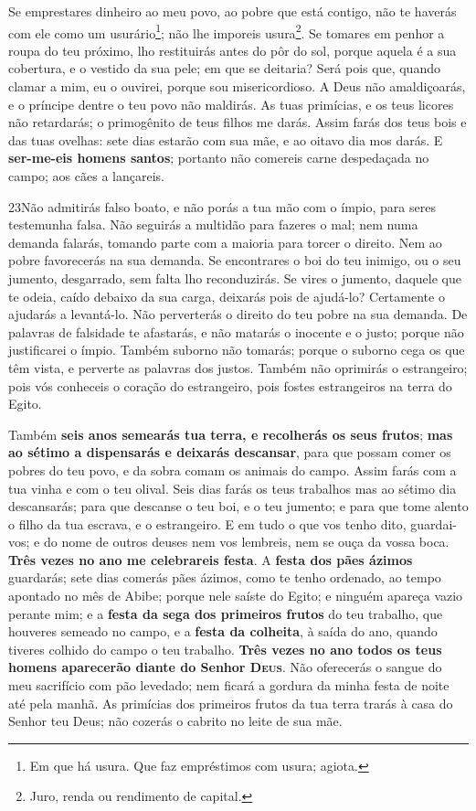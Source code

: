 Se emprestares dinheiro ao meu povo, ao pobre que está contigo,
não te haverás com ele como um usurário\footnote{Em que há usura.
Que faz empréstimos com usura; agiota.}; não lhe imporeis
usura\footnote{Juro, renda ou rendimento de capital.}. Se
tomares em penhor a roupa do teu próximo, lho restituirás antes do
pôr do sol, porque aquela é a sua cobertura, e o vestido da
sua pele; em que se deitaria? Será pois que, quando clamar a mim, eu
o ouvirei, porque sou misericordioso. A Deus não
amaldiçoarás, e o príncipe dentre o teu povo não maldirás. As
tuas primícias, e os teus licores não retardarás; o primogênito de
teus filhos me darás. Assim farás dos teus bois e das tuas
ovelhas: sete dias estarão com sua mãe, e ao oitavo dia mos darás.
E \textbf{ser-me-eis homens santos}; portanto não comereis
carne despedaçada no campo; aos cães a lançareis.

\medskip

\lettrine{23} Não admitirás falso boato, e não porás a tua mão
com o ímpio, para seres testemunha falsa. Não seguirás a
multidão para fazeres o mal; nem numa demanda falarás, tomando parte
com a maioria para torcer o direito. Nem ao pobre favorecerás na
sua demanda. Se encontrares o boi do teu inimigo, ou o seu
jumento, desgarrado, sem falta lho reconduzirás. Se vires o
jumento, daquele que te odeia, caído debaixo da sua carga, deixarás
pois de ajudá-lo? Certamente o ajudarás a levantá-lo. Não
perverterás o direito do teu pobre na sua demanda. De palavras
de falsidade te afastarás, e não matarás o inocente e o justo;
porque não justificarei o ímpio. Também suborno não tomarás;
porque o suborno cega os que têm vista, e perverte as palavras dos
justos. Também não oprimirás o estrangeiro; pois vós conheceis o
coração do estrangeiro, pois fostes estrangeiros na terra do Egito.

Também \textbf{seis anos semearás tua terra, e recolherás os seus
frutos}; \textbf{mas ao sétimo a dispensarás e deixarás
descansar}, para que possam comer os pobres do teu povo, e da sobra
comam os animais do campo. Assim farás com a tua vinha e com o teu
olival. Seis dias farás os teus trabalhos mas ao sétimo dia
descansarás; para que descanse o teu boi, e o teu jumento; e para
que tome alento o filho da tua escrava, e o estrangeiro. E em
tudo o que vos tenho dito, guardai-vos; e do nome de outros deuses
nem vos lembreis, nem se ouça da vossa boca. \textbf{Três
vezes no ano me celebrareis festa}. A \textbf{festa dos pães
ázimos} guardarás; sete dias comerás pães ázimos, como te tenho
ordenado, ao tempo apontado no mês de Abibe; porque nele saíste do
Egito; e ninguém apareça vazio perante mim; e a \textbf{festa
da sega dos primeiros frutos} do teu trabalho, que houveres semeado
no campo, e a \textbf{festa da colheita}, à saída do ano, quando
tiveres colhido do campo o teu trabalho. \textbf{Três vezes
no ano todos os teus homens aparecerão diante do Senhor
\textsc{Deus}}. Não oferecerás o sangue do meu sacrifício com
pão levedado; nem ficará a gordura da minha festa de noite até pela
manhã. As primícias dos primeiros frutos da tua terra trarás
à casa do Senhor teu Deus; não cozerás o cabrito no leite de sua
mãe.

